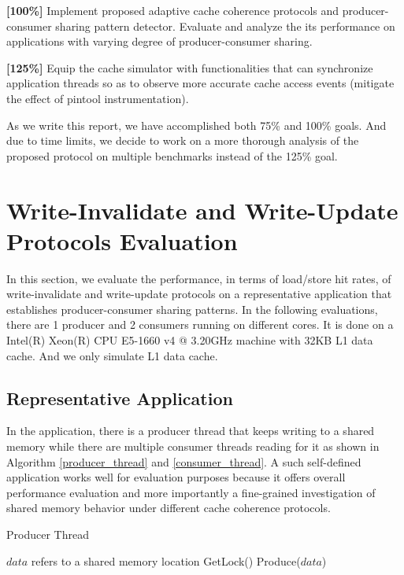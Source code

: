 \documentclass[conference]{IEEEtran}
\begin{document}
\textbf{[100\%]} Implement proposed adaptive cache coherence protocols and producer-consumer sharing pattern detector. Evaluate and analyze the its performance on applications with varying degree of producer-consumer sharing.

\textbf{[125\%]} Equip the cache simulator with functionalities that can synchronize application threads so as to observe more accurate cache access events (mitigate the effect of pintool instrumentation).

As we write this report, we have accomplished both 75\% and 100\% goals. And due to time limits, we decide to work on a more thorough analysis of the proposed protocol on multiple benchmarks instead of the 125\% goal.


\section{Write-Invalidate and Write-Update Protocols Evaluation}
In this section, we evaluate the performance, in terms of load/store hit rates, of write-invalidate and write-update protocols on a representative application that establishes producer-consumer sharing patterns. In the following evaluations, there are 1 producer and 2 consumers running on different cores. It is done on a Intel(R) Xeon(R) CPU E5-1660 v4 @ 3.20GHz machine with 32KB L1 data cache. And we only simulate L1 data cache.

\subsection{Representative Application}
In the application, there is a producer thread that keeps writing to a shared memory while there are multiple consumer threads reading for it as shown in Algorithm \ref{producer_thread} and \ref{consumer_thread}. A such self-defined application works well for evaluation purposes because it offers overall performance evaluation and more importantly a fine-grained investigation of shared memory behavior under different cache coherence protocols.

\begin{algorithm}
\caption{Producer Thread}
\label{producer_thread}
\begin{algorithmic}[1]
\State $data$ refers to a shared memory location
    \State GetLock() 
    \State Produce($data$)
\EndWhile
\end{algorithmic}
\end{algorithm}
\end{document}
